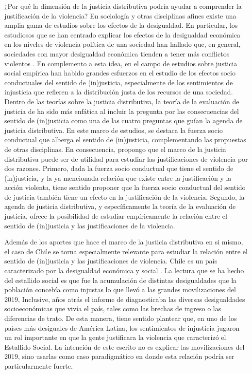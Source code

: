 \documentclass[12pt,twoside]{templates/facsothesis}
\begin{document}
¿Por qué la dimensión de la justicia distributiva podría ayudar a comprender la justificación de la violencia? En sociología y otras disciplinas afines existe una amplia gama de estudios sobre los efectos de la desigualdad. En particular, los estudiosos que se han centrado explicar los efectos de la desigualdad económica en los niveles de violencia política de una sociedad han hallado que, en general, sociedades con mayor desigualdad económica tienden a tener más conflictos violentos \citep{Ostby2013}. En complemento a esta idea, en el campo de estudios sobre justicia social empírica han habido grandes esfuerzos en el estudio de los efectos socio conductuales del sentido de (in)justicia, especialmente de los sentimientos de injusticia que refieren a la distribución justa de los recursos de una sociedad. Dentro de las teorías sobre la justicia distributiva, la teoría de la evaluación de justicia de \citet{Jasso1980} ha sido más enfática al incluir la pregunta por las consecuencias del sentido de (in)justicia como una de las cuatro preguntas que guían la agenda de justicia distributiva. En este marco de estudios, se destaca la fuerza socio conductual que alberga el sentido de (in)justicia, complementando las propuestas de otras disciplinas. En consecuencia, propongo que el marco de la justicia distributiva puede ser de utilidad para estudiar las justificaciones de violencia por dos razones. Primero, dada la fuerza socio conductual que tiene el sentido de (in)justicia, y la ya mencionada relación que existe entre la justificación y la acción violenta, tiene sentido proponer que la fuerza socio conductual del sentido de justicia también tiene un efecto en la justificación de la violencia. Segundo, la agenda de justicia distributiva, y específicamente la teoría de la evaluación de justicia, ofrece la posibilidad de estudiar empíricamente la relación entre el sentido de (in)justicia y las justificaciones de la violencia.

Además de los aportes que hace el marco de la justicia distributiva en si mismo, el caso de Chile se torna especialmente relevante para estudiar la relación entre el sentido de (in)justicia y las justificaciones de violencia. Chile es un país caracterizado por la desigualdad económica y social \citep{PNUD2017}. La lectura que se ha hecho del estallido social es que fue la acumulación de distintas desigualdades que la población concebía como injustas lo que llevó a las grandes movilizaciones del 2019, Inclusive, años atrás el informe de \citet{PNUD2017} diagnosticaba las diversas desigualdades socioeconómicas que vivía el país, tales como las brechas de ingreso o las diferencias de trato. De esta manera, tiene sentido plantear que, en uno de los países más desiguales de América Latina, los sentimientos de injusticia jugaron un rol importante en que la gente justificara la violencia que caracterizó el Estallido Social. La intención de este escrito no es explicar las movilizaciones del 2019, sino usarlas como caso paradigmático en donde esta relación podría ser particularmente fuerte.
\end{document}
